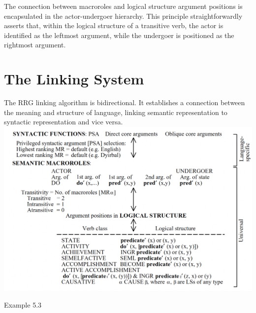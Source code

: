 The connection between macroroles and logical structure argument positions is encapsulated in the actor-undergoer hierarchy. This principle straightforwardly asserts that, within the logical structure of a transitive verb, the actor is identified as the leftmost argument, while the undergoer is positioned as the rightmost argument.


\section{The Linking System}

The RRG linking algorithm is bidirectional. It establishes a connection between the meaning and structure of language, linking semantic representation to syntactic representation and vice versa.  \\


\includegraphics[width=\textwidth]{figures/linking-algorithm.png}


Example 5.3 

